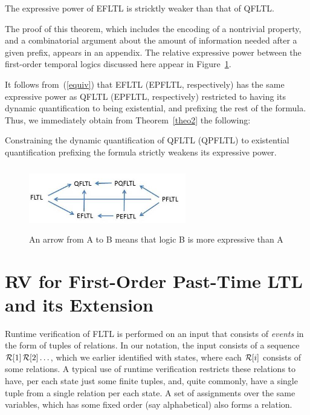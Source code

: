 \begin{theorem}
\label{theo2}
The expressive power of EFLTL is stricktly weaker than that of QFLTL.
\end{theorem}
The proof of this theorem, which includes the encoding of a nontrivial property, and a combinatorial argument about the amount of information
needed after a given prefix, appears in an appendix.
The relative expressive power between the first-order temporal logics discussed here
appear in Figure~\ref{fsfr}.

It follows from~(\ref{equiv}) that EFLTL (EPFLTL, respectively) has the same
expressive power as QFLTL (EPFLTL, respectively) restricted to having its
dynamic 
quantification to being existential, and prefixing the
rest of the formula. Thus, we immediately obtain from Theorem~\ref{theo2} the following:

\begin{corollary}
Constraining the dynamic quantification of QFLTL (QPFLTL) to existential quantification prefixing the
formula strictly weakens its expressive power.
\end{corollary}



\begin{figure}
\begin{center}
\includegraphics[height=1.1in,width=2.7in]{FIRST.jpg}
\caption{\label{fsfr} An arrow from A to B means that logic  B is more expressive than A}
\end{center}
\end{figure}


\section{RV for First-Order Past-Time LTL and its Extension}
\label{EPLTLRV}

Runtime verification of FLTL is performed on an
input that consists of {\em events} in the form of
tuples of relations. In our notation, the input
consists of a sequence ${\cal R}[1] \, {\cal R}[2]  \ldots$,
which we earlier identified with states, where each
${\cal R}[i]$ consists of some relations. A typical use
of runtime verification restricts these relations to have,
per each state just some finite tuples, and, quite commonly, have a single tuple from a single relation per each state.
A set of assignments over the same variables, which has some fixed order
(say alphabetical) also forms a relation.

